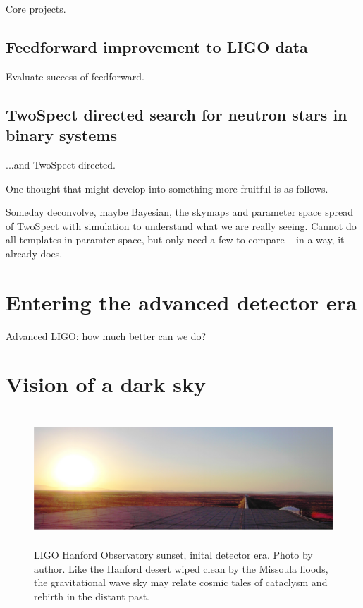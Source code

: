         Core projects.

        \subsection{Feedforward improvement to LIGO data}
        \label{feedforward_end}

            Evaluate success of feedforward.

        \subsection{TwoSpect directed search for neutron stars in binary systems}
        \label{TwoSpect_end}

            ...and TwoSpect-directed.

            One thought that might develop into something more fruitful is as follows.

            Someday deconvolve, maybe Bayesian, the skymaps and parameter space spread of TwoSpect with simulation to understand what we are really seeing. Cannot do all templates in paramter space, but only need a few to compare -- in a way, it already does.

    \section{Entering the advanced detector era}
    \label{advanced_detector_era}

        Advanced LIGO: how much better can we do?

    \section{Vision of a dark sky}
    \label{dark_sky}

\begin{figure}
\begin{center}
\includegraphics[height=50mm,width=148mm]{LIGOpanoramasmall.eps}
\caption{LIGO Hanford Observatory sunset, inital detector era. Photo by author. Like the Hanford desert wiped clean by the Missoula floods, the gravitational wave sky may relate cosmic tales of cataclysm and rebirth in the distant past.}
\label{LIGO_panorama_small}
\end{center}
\end{figure}

